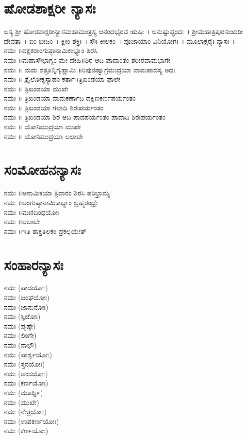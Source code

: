 \section{ಷೋಡಶಾಕ್ಷರೀ ನ್ಯಾಸಃ}
ಅಸ್ಯ ಶ್ರೀ ಷೋಡಶಾಕ್ಷರೀನ್ಯಾಸಮಹಾಮಂತ್ರಸ್ಯ ಆನಂದಭೈರವ ಋಷಿಃ~। ಅನುಷ್ಟುಪ್ಛಂದಃ~। ಶ್ರೀಮಹಾತ್ರಿಪುರಸುಂದರೀ ದೇವತಾ~। ಐಂ ಬೀಜಂ~। ಕ್ಲೀಂ ಶಕ್ತಿಃ~। ಸೌಃ ಕೀಲಕಂ~। ಪೂಜಾಯಾಂ ವಿನಿಯೋಗಃ~। ಮೂಲಾಕ್ಷರೈಃ ನ್ಯಾಸಃ~।\\
 ನಮಃ ॥ದಕ್ಷಕರಾಂಗುಷ್ಠಾನಾಮಿಕಾಭ್ಯಾಂ ಶಿರಸಿ\\
 ನಮಃ ॥ಮಹಾಸೌಭಾಗ್ಯಂ ಮೇ ದೇಹಿ॥ಶಿರ ಆದಿ ಪಾದಾಂತಂ ಶರೀರವಾಮಭಾಗೇ\\
 ನಮಃ ॥ ಮಮ ಶತ್ರೂನ್ನಿಗೃಹ್ಣಾಮಿ ॥ರಿಪುಜಿಹ್ವಾಗ್ರಮುದ್ರಯಾ ವಾಮಪಾದಸ್ಯ ಅಧಃ\\
 ನಮಃ ॥ ತ್ರೈಲೋಕ್ಯಸ್ಯಾಹಂ ಕರ್ತಾ॥ತ್ರಿಖಂಡಯಾ ಫಾಲೇ\\
 ನಮಃ ॥ ತ್ರಿಖಂಡಯಾ ಮುಖೇ\\
 ನಮಃ ॥ ತ್ರಿಖಂಡಯಾ ವಾಮಕರ್ಣಾದಿ ದಕ್ಷಿಣಕರ್ಣಪರ್ಯಂತಂ\\
 ನಮಃ ॥ ತ್ರಿಖಂಡಯಾ ಗಲಾದಿ ಶಿರಃಪರ್ಯಂತಂ\\
 ನಮಃ ॥ ತ್ರಿಖಂಡಯಾ ಶಿರ ಆದಿ ಪಾದಪರ್ಯಂತಂ ಪಾದಾದಿ ಶಿರಃಪರ್ಯಂತಂ\\
 ನಮಃ ॥ ಯೋನಿಮುದ್ರಯಾ ಮುಖೇ\\
 ನಮಃ ॥ ಯೋನಿಮುದ್ರಯಾ ಲಲಾಟೇ
\section{ಸಂಮೋಹನನ್ಯಾಸಃ}
 ನಮಃ ॥ಅನಾಮಿಕಯಾ ತ್ರಿವಾರಂ ಶಿರಸಿ ಪರಿಭ್ರಾಮ್ಯ\\
 ನಮಃ ॥ಅಂಗುಷ್ಠಾನಾಮಿಕಾಭ್ಯಾಂ ಬ್ರಹ್ಮರಂಧ್ರೇ\\
 ನಮಃ ॥ಮಣಿಬಂಧಯೋಃ\\
 ನಮಃ ॥ಲಲಾಟೇ\\
 ನಮಃ ॥ಇತಿ ಶಾಕ್ತತಿಲಕಂ ಪ್ರಕಲ್ಪಯೇತ್
\section{ಸಂಹಾರನ್ಯಾಸಃ}
 ನಮಃ (ಪಾದಯೋಃ)\\
 ನಮಃ (ಜಂಘಯೋಃ)\\
 ನಮಃ (ಜಾನುನೋಃ)\\
 ನಮಃ (ಸ್ಫಿಚೋಃ)\\
 ನಮಃ (ಪೃಷ್ಠೇ)\\
 ನಮಃ (ಲಿಂಗೇ)\\
 ನಮಃ (ನಾಭೌ)\\
 ನಮಃ (ಪಾರ್ಶ್ವಯೋಃ)\\
 ನಮಃ (ಸ್ತನಯೋಃ)\\
 ನಮಃ (ಅಂಸಯೋಃ)\\
 ನಮಃ (ಕರ್ಣಯೋಃ)\\
 ನಮಃ (ಮೂರ್ಧ್ನಿ)\\
 ನಮಃ (ಮುಖೇ)\\
 ನಮಃ (ನೇತ್ರಯೋಃ)\\
 ನಮಃ (ಉಪಕರ್ಣಯೋಃ)\\
 ನಮಃ (ಕರ್ಣಯೋಃ)
